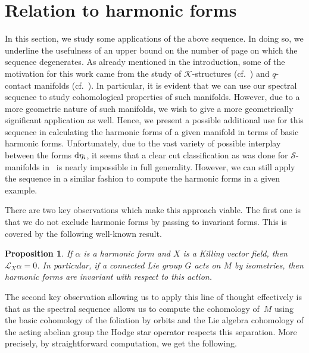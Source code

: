 \documentclass[pdftex]{sigma}
\numberwithin{equation}{section}
\newtheorem{prop}[tw]{Proposition}
\theoremstyle{definition}
\begin{document}
\section{Relation to harmonic forms}%
In this section, we study some applications of the above sequence. In doing so, we underline the usefulness of an upper bound on the number of page on which the sequence degenerates. As already mentioned in the introduction, some of the motivation for this work came from the study of $\mathcal{K}$-structures (cf.~\cite{B}) and $q$-contact manifolds (cf.~\cite{F}). In particular, it is evident that we can use our spectral sequence to study cohomological properties of such manifolds. However, due to a more geometric nature of such manifolds, we wish to give a more geometrically significant application as well. Hence, we present a possible additional use for this sequence in calculating the harmonic forms of a given manifold in terms of basic harmonic forms. Unfortunately, due to the vast variety of possible interplay between the forms ${\rm d}\eta_i$, it seems that a clear cut classification as was done for $\mathcal{S}$-manifolds in~\cite{My4} is nearly impossible in full generality. However, we can still apply the sequence in a similar fashion to compute the harmonic forms in a given example.

There are two key observations which make this approach viable. The first one is that we do not exclude harmonic forms by passing to invariant forms. This is covered by the following well-known result.

\begin{prop} If $\alpha$ is a harmonic form and $X$ is a Killing vector field, then $\mathcal{L}_X\alpha=0$. In particular, if a connected Lie group $G$ acts on $M$ by isometries, then harmonic forms are invariant with respect to this action.
\end{prop}

The second key observation allowing us to apply this line of thought effectively is that as the spectral sequence allows us to compute the cohomology of~$M$ using the basic cohomology of the foliation by orbits and the Lie algebra cohomology of the acting abelian group the Hodge star operator respects this separation. More precisely, by straightforward computation, we get the following.
\end{document}
